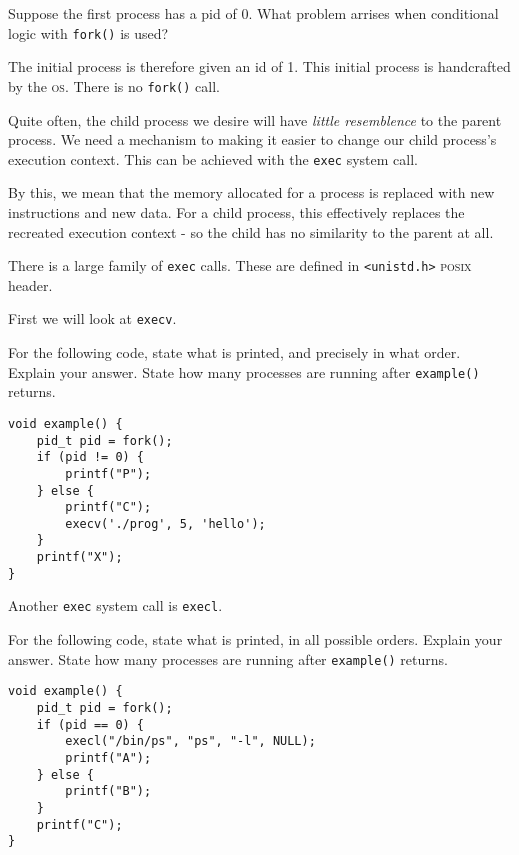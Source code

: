 \frmrule

\begin{example}
Suppose the first process has a pid of 0. What problem arrises 
when conditional logic with \lstinline{fork()} is used?
\end{example}

The initial process is therefore given an id of 1.
This initial process is handcrafted by the \textsc{os}. 
There is no \lstinline{fork()} call. 


\frmrule

Quite often, the child process we desire will have \textit{little resemblence} 
to the parent process. We need a mechanism to making it easier to change our child 
process's execution context. This can be achieved with the \lstinline{exec} 
system call.


By this, we mean that the memory allocated for a process is replaced with new 
instructions and new data. For a child process, this effectively 
replaces the recreated execution context - so the child has no similarity 
to the parent at all. 

There is a large family of \lstinline{exec} calls. These are defined in  
\lstinline{<unistd.h>} \textsc{posix} header.


First we will look at \lstinline{execv}.

\frmrule

\begin{example}
For the following code, state what is printed, and precisely in what order.
Explain your answer. State how many processes are running 
after \lstinline{example()} returns.

\begin{lstlisting}
void example() {
    pid_t pid = fork();
    if (pid != 0) {
        printf("P");
    } else {
        printf("C");
        execv('./prog', 5, 'hello');
    }       
    printf("X");
}
\end{lstlisting}
\end{example}

\frmrule

Another \lstinline{exec} system call is \lstinline{execl}.

\begin{example}
For the following code, state what is printed, in all possible orders.
Explain your answer. State how many processes are running 
after \lstinline{example()} returns.

\begin{lstlisting}
void example() {
    pid_t pid = fork();
    if (pid == 0) {
        execl("/bin/ps", "ps", "-l", NULL);
        printf("A");
    } else {
        printf("B");
    }
    printf("C");
}
\end{lstlisting}
\end{example}

